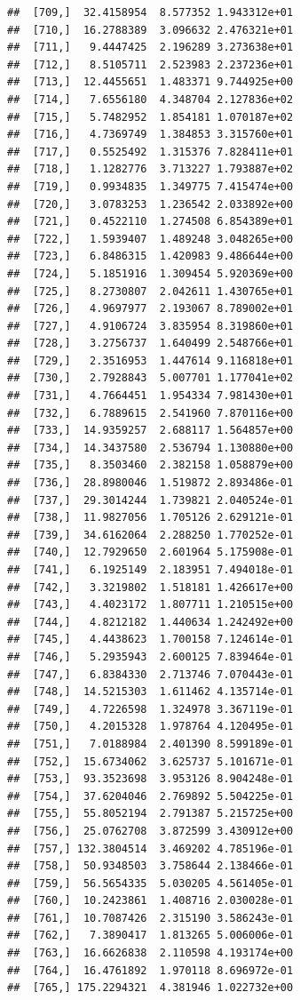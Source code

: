 \documentclass[article]{jss}\usepackage[]{graphicx}\usepackage[]{xcolor}
\makeatletter
\newenvironment{kframe}{%
 \def\at@end@of@kframe{}%
 \ifinner\ifhmode%
  \def\at@end@of@kframe{\end{minipage}}%
  \begin{minipage}{\columnwidth}%
 \fi\fi%
 \def\FrameCommand##1{\hskip\@totalleftmargin \hskip-\fboxsep
 \colorbox{shadecolor}{##1}\hskip-\fboxsep
     \hskip-\linewidth \hskip-\@totalleftmargin \hskip\columnwidth}%
 \MakeFramed {\advance\hsize-\width
   \@totalleftmargin\z@ \linewidth\hsize
   \@setminipage}}%
 {\par\unskip\endMakeFramed%
 \at@end@of@kframe}
\newenvironment{knitrout}{}{} %
\makeatother
\begin{document}
\begin{knitrout}
\begin{kframe}
\begin{verbatim}
##  [709,]  32.4158954  8.577352 1.943312e+01
##  [710,]  16.2788389  3.096632 2.476321e+01
##  [711,]   9.4447425  2.196289 3.273638e+01
##  [712,]   8.5105711  2.523983 2.237236e+01
##  [713,]  12.4455651  1.483371 9.744925e+00
##  [714,]   7.6556180  4.348704 2.127836e+02
##  [715,]   5.7482952  1.854181 1.070187e+02
##  [716,]   4.7369749  1.384853 3.315760e+01
##  [717,]   0.5525492  1.315376 7.828411e+01
##  [718,]   1.1282776  3.713227 1.793887e+02
##  [719,]   0.9934835  1.349775 7.415474e+00
##  [720,]   3.0783253  1.236542 2.033892e+00
##  [721,]   0.4522110  1.274508 6.854389e+01
##  [722,]   1.5939407  1.489248 3.048265e+00
##  [723,]   6.8486315  1.420983 9.486644e+00
##  [724,]   5.1851916  1.309454 5.920369e+00
##  [725,]   8.2730807  2.042611 1.430765e+01
##  [726,]   4.9697977  2.193067 8.789002e+01
##  [727,]   4.9106724  3.835954 8.319860e+01
##  [728,]   3.2756737  1.640499 2.548766e+01
##  [729,]   2.3516953  1.447614 9.116818e+01
##  [730,]   2.7928843  5.007701 1.177041e+02
##  [731,]   4.7664451  1.954334 7.981430e+01
##  [732,]   6.7889615  2.541960 7.870116e+00
##  [733,]  14.9359257  2.688117 1.564857e+00
##  [734,]  14.3437580  2.536794 1.130880e+00
##  [735,]   8.3503460  2.382158 1.058879e+00
##  [736,]  28.8980046  1.519872 2.893486e-01
##  [737,]  29.3014244  1.739821 2.040524e-01
##  [738,]  11.9827056  1.705126 2.629121e-01
##  [739,]  34.6162064  2.288250 1.770252e-01
##  [740,]  12.7929650  2.601964 5.175908e-01
##  [741,]   6.1925149  2.183951 7.494018e-01
##  [742,]   3.3219802  1.518181 1.426617e+00
##  [743,]   4.4023172  1.807711 1.210515e+00
##  [744,]   4.8212182  1.440634 1.242492e+00
##  [745,]   4.4438623  1.700158 7.124614e-01
##  [746,]   5.2935943  2.600125 7.839464e-01
##  [747,]   6.8384330  2.713746 7.070443e-01
##  [748,]  14.5215303  1.611462 4.135714e-01
##  [749,]   4.7226598  1.324978 3.367119e-01
##  [750,]   4.2015328  1.978764 4.120495e-01
##  [751,]   7.0188984  2.401390 8.599189e-01
##  [752,]  15.6734062  3.625737 5.101671e-01
##  [753,]  93.3523698  3.953126 8.904248e-01
##  [754,]  37.6204046  2.769892 5.504225e-01
##  [755,]  55.8052194  2.791387 5.215725e+00
##  [756,]  25.0762708  3.872599 3.430912e+00
##  [757,] 132.3804514  3.469202 4.785196e-01
##  [758,]  50.9348503  3.758644 2.138466e-01
##  [759,]  56.5654335  5.030205 4.561405e-01
##  [760,]  10.2423861  1.408716 2.030028e-01
##  [761,]  10.7087426  2.315190 3.586243e-01
##  [762,]   7.3890417  1.813265 5.006006e-01
##  [763,]  16.6626838  2.110598 4.193174e+00
##  [764,]  16.4761892  1.970118 8.696972e-01
##  [765,] 175.2294321  4.381946 1.022732e+00

\end{verbatim}
\end{kframe}
\end{knitrout}
\end{document}
